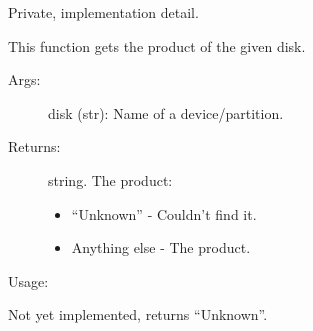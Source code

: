 \documentclass[letterpaper,10pt,english]{sphinxmanual}
\begin{document}

\begin{fulllineitems}
\label{\detokenize{macos:getdevinfo.macos.get_product}}
Private, implementation detail.

This function gets the product of the given disk.
\begin{description}
\item[{Args:}] \leavevmode
disk (str):   Name of a device/partition.

\item[{Returns:}] \leavevmode
string. The product:
\begin{itemize}
\item {} 
“Unknown”     - Couldn’t find it.

\item {} 
Anything else - The product.

\end{itemize}

\end{description}

Usage:

\begin{sphinxVerbatim}[commandchars=\\\{\}]
  
\end{sphinxVerbatim}

\end{fulllineitems}


\begin{fulllineitems}
\label{\detokenize{macos:getdevinfo.macos.get_uuid}}
Not yet implemented, returns “Unknown”.

\end{fulllineitems}

\end{document}
